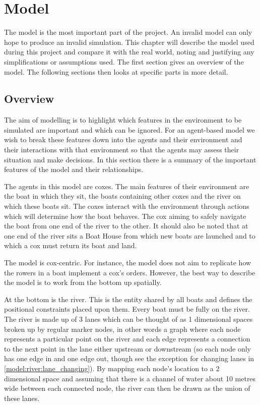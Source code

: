 \chapter{Model} \label{chapter:model}
  The model is the most important part of the project. An invalid model can only hope to produce an invalid simulation. This chapter will describe the model used during this project and compare it with the real world, noting and justifying any simplifications or assumptions used. The first section gives an overview of the model. The following sections then looks at specific parts in more detail.
  
  \section{Overview}
    The aim of modelling is to highlight which features in the environment to be simulated are important and which can be ignored\cite{Sterling2009}. For an agent-based model we wish to break these features down into the agents and their environment and their interactions with that environment so that the agents may assess their situation and make decisions\cite{Bonabeau2002}. In this section there is a summary of the important features of the model and their relationships.
    
    The agents in this model are coxes. The main features of their environment are the boat in which they sit, the boats containing other coxes and the river on which these boats sit. The coxes interact with the environment through actions which will determine how the boat behaves. The cox aiming to safely navigate the boat from one end of the river to the other. It should also be noted that at one end of the river sits a Boat House from which new boats are launched and to which a cox must return its boat and land.
    
    The model is cox-centric. For instance, the model does not aim to replicate how the rowers in a boat implement a cox's orders. However, the best way to describe the model is to work from the bottom up spatially.
    
    At the bottom is the river. This is the entity shared by all boats and defines the positional constraints placed upon them. Every boat must be fully on the river. The river is made up of 3 lanes which can be thought of as 1 dimensional spaces broken up by regular marker nodes, in other words a graph where each node represents a particular point on the river and each edge represents a connection to the next point in the lane either upstream or downstream (so each node only has one edge in and one edge out, though see the exception for changing lanes in \ref{model:river:lane_changing}). By mapping each node's location to a 2 dimensional space and assuming that there is a channel of water about 10 metres wide between each connected node, the river can then be drawn as the union of these lanes.
    
